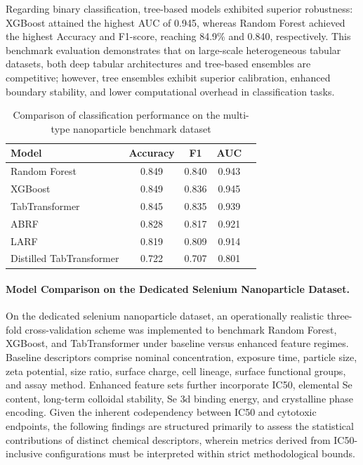 Regarding binary classification, tree-based models exhibited superior robustness: XGBoost attained the highest AUC of 0.945, whereas Random Forest achieved the highest Accuracy and F1-score, reaching 84.9\% and 0.840, respectively. This benchmark evaluation demonstrates that on large-scale heterogeneous tabular datasets, both deep tabular architectures and tree-based ensembles are competitive; however, tree ensembles exhibit superior calibration, enhanced boundary stability, and lower computational overhead in classification tasks.

\begin{table}[htbp]
  \centering
  \caption{Comparison of classification performance on the multi-type nanoparticle benchmark dataset}
  \label{tab:benchmark_classification}
  \begin{tabular}{lcccc}
    \hline
    Model & Accuracy & F1 & AUC \\
    \hline
    Random Forest & 0.849 & 0.840 & 0.943 \\
    XGBoost & 0.849 & 0.836 & 0.945 \\
    TabTransformer & 0.845 & 0.835 & 0.939 \\
    ABRF & 0.828 & 0.817 & 0.921 \\
    LARF & 0.819 & 0.809 & 0.914 \\
    Distilled TabTransformer & 0.722 & 0.707 & 0.801 \\
    \hline
  \end{tabular}
\end{table}

\paragraph{Model Comparison on the Dedicated Selenium Nanoparticle Dataset.}
On the dedicated selenium nanoparticle dataset, an operationally realistic three-fold cross-validation scheme was implemented to benchmark Random Forest, XGBoost, and TabTransformer under baseline versus enhanced feature regimes. Baseline descriptors comprise nominal concentration, exposure time, particle size, zeta potential, size ratio, surface charge, cell lineage, surface functional groups, and assay method. Enhanced feature sets further incorporate IC50, elemental Se content, long-term colloidal stability, Se 3d binding energy, and crystalline phase encoding. Given the inherent codependency between IC50 and cytotoxic endpoints, the following findings are structured primarily to assess the statistical contributions of distinct chemical descriptors, wherein metrics derived from IC50-inclusive configurations must be interpreted within strict methodological bounds.

